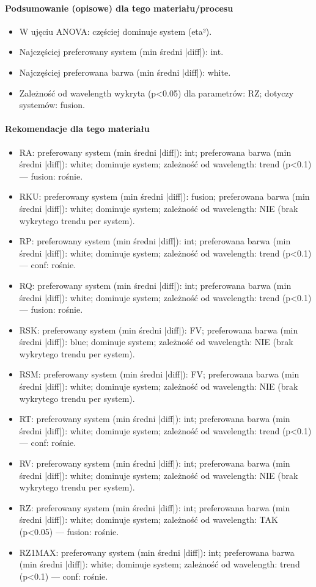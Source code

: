 \documentclass[
  10pt,
]{article}
\begin{document}
\paragraph{Podsumowanie (opisowe) dla tego materiału/procesu}
\begin{itemize}
\item W ujęciu ANOVA: częściej dominuje system (eta²).
\item Najczęściej preferowany system (min średni |diff|): int.
\item Najczęściej preferowana barwa (min średni |diff|): white.
\item Zależność od wavelength wykryta (p<0.05) dla parametrów: RZ; dotyczy systemów: fusion.
\end{itemize}
\paragraph{Rekomendacje dla tego materiału}
\begin{itemize}
\item RA: preferowany system (min średni |diff|): int; preferowana barwa (min średni |diff|): white; dominuje system; zależność od wavelength: trend (p<0.1) — fusion: rośnie.
\item RKU: preferowany system (min średni |diff|): fusion; preferowana barwa (min średni |diff|): white; dominuje system; zależność od wavelength: NIE (brak wykrytego trendu per system).
\item RP: preferowany system (min średni |diff|): int; preferowana barwa (min średni |diff|): white; dominuje system; zależność od wavelength: trend (p<0.1) — conf: rośnie.
\item RQ: preferowany system (min średni |diff|): int; preferowana barwa (min średni |diff|): white; dominuje system; zależność od wavelength: trend (p<0.1) — fusion: rośnie.
\item RSK: preferowany system (min średni |diff|): FV; preferowana barwa (min średni |diff|): blue; dominuje system; zależność od wavelength: NIE (brak wykrytego trendu per system).
\item RSM: preferowany system (min średni |diff|): FV; preferowana barwa (min średni |diff|): white; dominuje system; zależność od wavelength: NIE (brak wykrytego trendu per system).
\item RT: preferowany system (min średni |diff|): int; preferowana barwa (min średni |diff|): white; dominuje system; zależność od wavelength: trend (p<0.1) — conf: rośnie.
\item RV: preferowany system (min średni |diff|): int; preferowana barwa (min średni |diff|): white; dominuje system; zależność od wavelength: NIE (brak wykrytego trendu per system).
\item RZ: preferowany system (min średni |diff|): int; preferowana barwa (min średni |diff|): white; dominuje system; zależność od wavelength: TAK (p<0.05) — fusion: rośnie.
\item RZ1MAX: preferowany system (min średni |diff|): int; preferowana barwa (min średni |diff|): white; dominuje system; zależność od wavelength: trend (p<0.1) — conf: rośnie.
\end{itemize}
\end{document}
